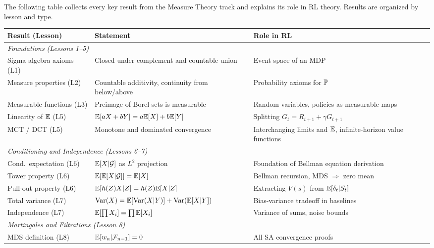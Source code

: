 \documentclass[11pt,a4paper]{article}
\begin{document}
The following table collects every key result from the
Measure Theory track and explains its role in RL theory.
Results are organized by lesson and type.

\begin{center}
\renewcommand{\arraystretch}{1.4}
\small
\begin{tabular}{p{2.5cm} p{4.5cm} p{5.5cm}}
\toprule
\textbf{Result (Lesson)} & \textbf{Statement}
  & \textbf{Role in RL} \\
\midrule
\multicolumn{3}{l}{\textit{Foundations (Lessons 1--5)}} \\
\midrule
Sigma-algebra axioms (L1)
  & Closed under complement and countable union
  & Event space of an MDP \\
\addlinespace
Measure properties (L2)
  & Countable additivity, continuity from below/above
  & Probability axioms for $\mathbb{P}$ \\
\addlinespace
Measurable functions (L3)
  & Preimage of Borel sets is measurable
  & Random variables, policies as measurable maps \\
\addlinespace
Linearity of $\mathbb{E}$ (L5)
  & $\mathbb{E}[aX + bY] = a\mathbb{E}[X] + b\mathbb{E}[Y]$
  & Splitting $G_t = R_{t+1} + \gamma G_{t+1}$ \\
\addlinespace
MCT / DCT (L5)
  & Monotone and dominated convergence
  & Interchanging limits and $\mathbb{E}$, infinite-horizon
    value functions \\
\midrule
\multicolumn{3}{l}{\textit{Conditioning and Independence
  (Lessons 6--7)}} \\
\midrule
Cond.\ expectation (L6)
  & $\mathbb{E}[X|\mathcal{G}]$ as $L^2$ projection
  & Foundation of Bellman equation derivation \\
\addlinespace
Tower property (L6)
  & $\mathbb{E}[\mathbb{E}[X|\mathcal{G}]] = \mathbb{E}[X]$
  & Bellman recursion, MDS $\Rightarrow$ zero mean \\
\addlinespace
Pull-out property (L6)
  & $\mathbb{E}[h(Z)X | Z] = h(Z)\mathbb{E}[X|Z]$
  & Extracting $V(s)$ from $\mathbb{E}[\delta_t | S_t]$ \\
\addlinespace
Total variance (L7)
  & $\operatorname{Var}(X) = \mathbb{E}[\operatorname{Var}(X|Y)] + \operatorname{Var}(\mathbb{E}[X|Y])$
  & Bias-variance tradeoff in baselines \\
\addlinespace
Independence (L7)
  & $\mathbb{E}[\prod X_i] = \prod \mathbb{E}[X_i]$
  & Variance of sums, noise bounds \\
\midrule
\multicolumn{3}{l}{\textit{Martingales and Filtrations
  (Lesson 8)}} \\
\midrule
MDS definition (L8)
  & $\mathbb{E}[w_n | \mathcal{F}_{n-1}] = 0$
  & All SA convergence proofs \\

\end{tabular}
\end{center}
\end{document}

